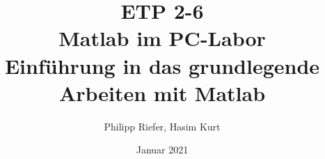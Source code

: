\documentclass{article}
\title{\textbf{ETP 2-6}\\Matlab im PC-Labor\\Einführung in das grundlegende Arbeiten mit Matlab}
\author{Philipp Riefer, Hasim Kurt}
\date{Januar 2021}
\begin{document}
\maketitle
\tableofcontents
\clearpage

\pagebreak



\pagebreak


\end{document}
